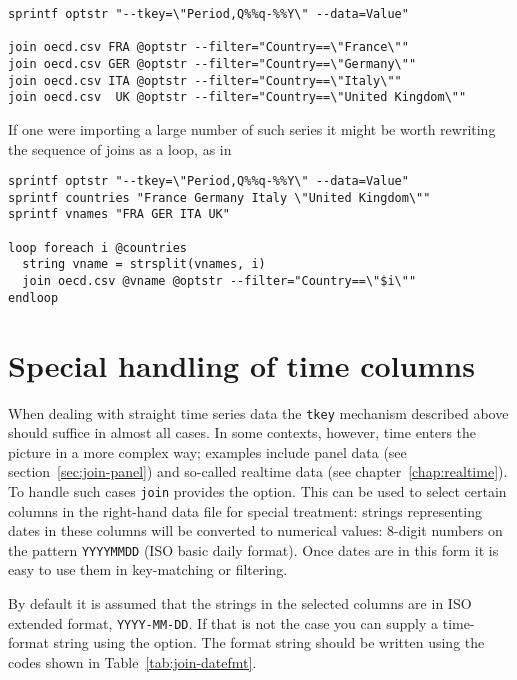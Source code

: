 \begin{footnotesize}
\begin{verbatim}
sprintf optstr "--tkey=\"Period,Q%%q-%%Y\" --data=Value"

join oecd.csv FRA @optstr --filter="Country==\"France\""
join oecd.csv GER @optstr --filter="Country==\"Germany\""
join oecd.csv ITA @optstr --filter="Country==\"Italy\""
join oecd.csv  UK @optstr --filter="Country==\"United Kingdom\""
\end{verbatim}
\end{footnotesize}

If one were importing a large number of such series it might be worth
rewriting the sequence of joins as a loop, as in

\begin{footnotesize}
\begin{verbatim}
sprintf optstr "--tkey=\"Period,Q%%q-%%Y\" --data=Value"
sprintf countries "France Germany Italy \"United Kingdom\""
sprintf vnames "FRA GER ITA UK"

loop foreach i @countries
  string vname = strsplit(vnames, i)
  join oecd.csv @vname @optstr --filter="Country==\"$i\""
endloop
\end{verbatim}
\end{footnotesize}
\section{Special handling of time columns}
\label{sec:join-tconvert}

When dealing with straight time series data the \texttt{tkey}
mechanism described above should suffice in almost all cases. In some
contexts, however, time enters the picture in a more complex way;
examples include panel data (see section~\ref{sec:join-panel}) and
so-called realtime data (see chapter~\ref{chap:realtime}). To handle
such cases \texttt{join} provides the  option. This
can be used to select certain columns in the right-hand data file for
special treatment: strings representing dates in these columns will be
converted to numerical values: 8-digit numbers on the pattern
\texttt{YYYYMMDD} (ISO basic daily format).  Once dates are in this
form it is easy to use them in key-matching or filtering.

By default it is assumed that the strings in the selected columns are
in ISO extended format, \texttt{YYYY-MM-DD}. If that is not
the case you can supply a time-format string using the
 option. The format string should be written using
the codes shown in Table~\ref{tab:join-datefmt}.

